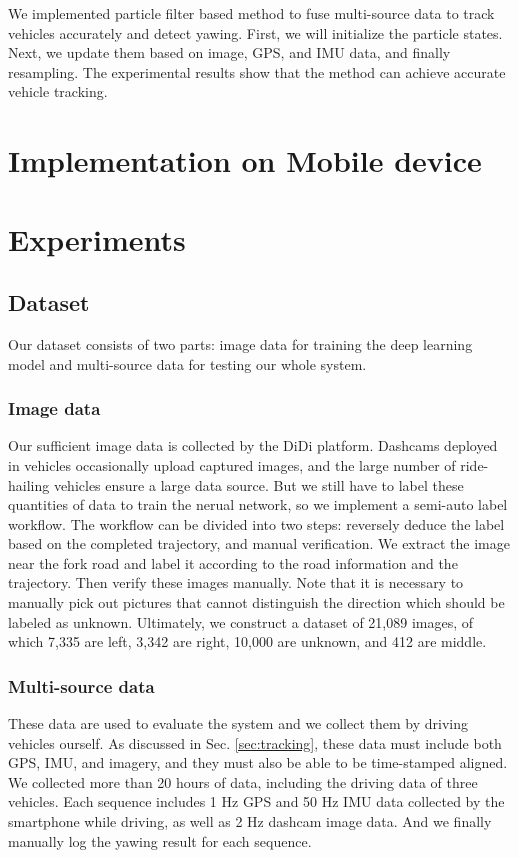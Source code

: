 \documentclass[journal]{IEEEtran}
\begin{document}
We implemented particle filter based method to fuse multi-source data to track vehicles accurately and detect yawing. First, we will initialize the particle states. Next, we update them based on image, GPS, and IMU data, and finally resampling. The experimental results show that the method can achieve accurate vehicle tracking.

\section{Implementation on Mobile device}

\section{Experiments}\label{sec:exp}
\subsection{Dataset}
Our dataset consists of two parts: image data for training the deep learning model and multi-source data for testing our whole system.
\subsubsection{Image data}
Our sufficient image data is collected by the DiDi platform. Dashcams deployed in vehicles occasionally upload captured images, and the large number of ride-hailing vehicles ensure a large data source. 
But we still have to label these quantities of data to train the nerual network, so we implement a semi-auto label workflow. The workflow can be divided into two steps: reversely deduce the label based on the completed trajectory, and manual verification. We extract the image near the fork road and label it according to the road information and the trajectory. Then verify these images manually. Note that it is necessary to manually pick out pictures that cannot distinguish the direction which should be labeled as unknown.
Ultimately, we construct a dataset of 21,089 images, of which 7,335 are left, 3,342 are right, 10,000 are unknown, and 412 are middle.
\subsubsection{Multi-source data}
These data are used to evaluate the system and we collect them by driving vehicles ourself. As discussed in Sec. \ref{sec:tracking}, these data must include both GPS, IMU, and imagery, and they must also be able to be time-stamped aligned. 
We collected more than 20 hours of data, including the driving data of three vehicles. Each sequence includes 1 Hz GPS and 50 Hz IMU data collected by the smartphone while driving, as well as 2 Hz dashcam image data. And we finally manually log the yawing result for each sequence.
\end{document}
